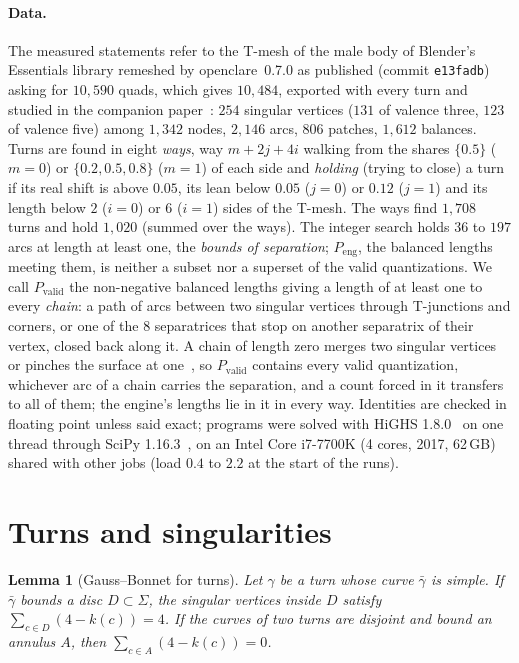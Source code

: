 \documentclass[11pt,a4paper]{article}
\newtheorem{lemma}{Lemma}
\newcommand{\lean}[1]{\texttt{\detokenize{#1}}}
\newenvironment{evidence}[3][]{}{}
\begin{document}
\paragraph{Data.}
The measured statements refer to the T-mesh of the male body of Blender's
Essentials library remeshed by openclare~0.7.0 as published (commit
\texttt{e13fadb}) asking for $10{,}590$ quads, which gives $10{,}484$,
exported with every turn and studied in the companion
paper~\cite[\S7]{gardent2026loops}: $254$ singular vertices ($131$ of valence
three, $123$ of valence five) among $1{,}342$ nodes, $2{,}146$ arcs, $806$
patches, $1{,}612$ balances. Turns are found in eight \emph{ways}, way $m + 2j + 4i$ walking from
the shares $\{0.5\}$ ($m = 0$) or $\{0.2, 0.5, 0.8\}$ ($m = 1$) of each side
and \emph{holding} (trying to close) a turn if its real shift is above $0.05$,
its lean below $0.05$ ($j = 0$) or $0.12$ ($j = 1$) and its length below $2$
($i = 0$) or $6$ ($i = 1$) sides of the T-mesh. The
ways find $1{,}708$ turns and hold $1{,}020$ (summed over the ways). The integer
search holds $36$ to $197$ arcs at length at least one, the \emph{bounds of
separation}; $P_{\mathrm{eng}}$, the
balanced lengths meeting them, is neither a subset nor a superset of the valid
quantizations. We call $P_{\mathrm{valid}}$ the non-negative balanced lengths
giving a length of at least one to every \emph{chain}: a path of arcs between
two singular vertices through T-junctions and corners, or one of the $8$
separatrices that stop on another separatrix of their vertex, closed back
along it. A chain of length zero merges two singular vertices or pinches the
surface at one~\cite[\S4.1]{lyon2021constrained}, so $P_{\mathrm{valid}}$
contains every valid quantization, whichever arc of a chain carries the
separation, and a count forced in it transfers to all of them; the engine's
lengths lie in it in every way. Identities are checked in floating point unless said exact;
programs were solved with HiGHS 1.8.0~\cite{huangfu2018highs} on one thread
through SciPy 1.16.3~\cite{virtanen2020scipy}, on an Intel Core i7-7700K
(4 cores, 2017, 62\,GB) shared with other jobs (load $0.4$ to $2.2$ at the
start of the runs).

\section{Turns and singularities}\label{sec:holonomy}

\begin{evidence}{core}{\lean{gauss_bonnet_turn}, \lean{gauss_bonnet}; tested: 3{,}833 regions of simple strips on 50 random instances, 35 spheres and 15 tori; assumed: the curve bounds a disc (or an annulus) of quads}
\begin{lemma}[Gauss--Bonnet for turns]\label{lem:gauss}
Let $\gamma$ be a turn whose curve $\bar\gamma$ is simple. If $\bar\gamma$
bounds a disc $D \subset \Sigma$, the singular vertices inside $D$ satisfy
$\sum_{c \in D} (4 - k(c)) = 4$. If the curves of two turns are disjoint and
bound an annulus $A$, then $\sum_{c \in A} (4 - k(c)) = 0$.
\end{lemma}
\end{evidence}
\end{document}
